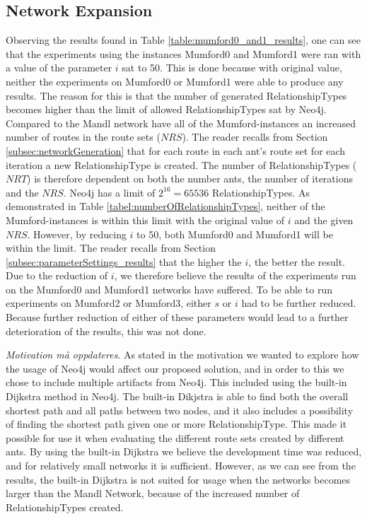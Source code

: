 \subsection{Network Expansion}
\label{subsec:networkExpansion}


Observing the results found in Table \vref{table:mumford0_and1_results}, one can see that the experiments using the  instances Mumford0 and Mumford1 were ran with a value of the parameter $i$ sat to 50. This is done because with original value, neither the experiments on Mumford0 or Mumford1 were able to produce any results. The reason for this is that the number of generated RelationshipTypes becomes higher than the limit of allowed RelationshipTypes sat by Neo4j. Compared to the Mandl network have all of the Mumford-instances an increased number of routes in the route sets ($NRS$). The reader recalls from Section \vref{subsec:networkGeneration} that for each route in each ant's route set for each iteration a new RelationshipType is created. The number of RelationshipTypes ($NRT$) is therefore dependent on both the number ants, the number of iterations and the $NRS$. Neo4j has a limit of $2^{16} = 65 536$ RelationshipTypes. As demonstrated in Table \vref{tabel:numberOfRelationshipTypes}, neither of the Mumford-instances is within this limit with the original value of $i$ and the given $NRS$. However, by reducing $i$ to 50, both Mumford0 and Mumford1 will be within the limit. The reader recalls from Section \vref{subsec:parameterSettings_results} that the higher the $i$, the better the result. Due to the reduction of $i$, we therefore believe the results of the experiments run on the Mumford0 and Mumford1 networks have suffered. To be able to run experiments on Mumford2 or Mumford3, either $s$ or $i$ had to be further reduced. Because further reduction of either of these parameters would lead to a further deterioration of the results, this was not done.

\emph{\color{blue} Motivation må oppdateres}. As stated in the motivation we wanted to explore how the usage of Neo4j would affect our proposed solution, and in order to this we chose to include multiple artifacts from Neo4j. This included using the built-in Dijkstra method in Neo4j. The built-in Dikjstra is able to find both the overall shortest path and all paths between two nodes, and it also includes a possibility of finding the shortest path given one or more RelationshipType. This made it possible for use it when evaluating the different route sets created by different ants. 
By using the built-in Dijkstra we believe the development time was reduced, and for relatively small networks it is sufficient. However, as we can see from the results, the built-in Dijkstra is not suited for usage when the networks becomes larger than the Mandl Network, because of the increased number of RelationshipTypes created.


